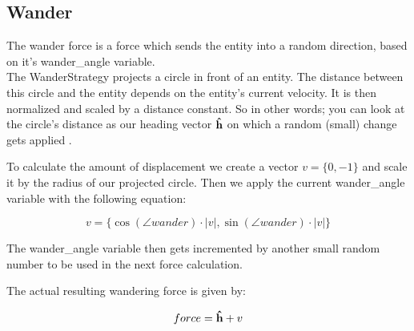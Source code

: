 \subsection{Wander}
\label{sec:wander}
The wander force is a force which sends the entity into a random direction, 
based on it's wander\_angle variable. \\
The WanderStrategy projects a circle in front of an entity. The distance 
between this circle and the entity depends on the entity's current velocity. 
It is then normalized and scaled by a distance constant. So in other words; 
you can look at the circle's distance as our heading vector $ \boldsymbol{\hat{\textbf{h}}} $ on 
which a random (small) change gets applied \cite[pg. 96]{buckland}. 

To calculate the amount of displacement we create a vector $ v = \{ 0, -1\} $
 and scale it by the radius of our projected circle. Then we apply the current 
 wander\_angle variable with the following equation:

 \large
 $$ v = \{ \cos{(\angle wander)} \cdot |v|, \sin{(\angle wander)} \cdot |v| \} $$
 \normalsize

 The wander\_angle variable then gets incremented by another small random 
 number to be used in the next force calculation.

 The actual resulting wandering force is given by:

 \large
 $$ force = \boldsymbol{\hat{\textbf{h}}} + v $$
 \normalsize

